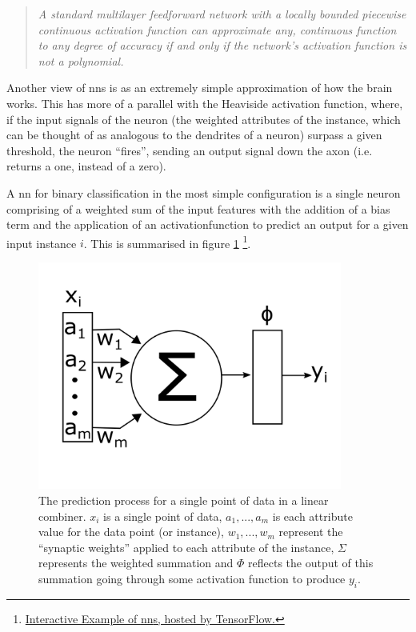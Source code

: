 \begin{quote}
    \textit{A standard multilayer feedforward network with a locally bounded piecewise continuous activation function can approximate any, continuous function to any degree of accuracy if and only if the network's activation function is not a polynomial.\cite{uap_mlp}}
\end{quote}

Another view of \gls{nn}s is as an extremely simple approximation of how the brain works. This has more of a parallel with the Heaviside activation function, where, if the input signals of the neuron (the weighted attributes of the \gls{instance}, which can be thought of as analogous to the dendrites of a neuron) surpass a given threshold, the neuron \enquote{fires}, sending an output signal down the axon (i.e. returns a one, instead of a zero).
\bigskip

A \gls{nn} for binary classification in the most simple configuration is a single \gls{neuron} comprising of a weighted sum of the input features with the addition of a bias term and the application of an \gls{activationfunction} to predict an output for a given input \gls{instance} $i$. This is summarised in figure \ref{fig:nn_simple} \footnote{\href{https://playground.tensorflow.org/}{Interactive Example of \gls{nn}s, hosted by TensorFlow.}}.  
\bigskip

\begin{figure}[H]
    \centering
    \includegraphics[width=100mm]{figs/nn_simple.png}
    \caption[The prediction process for a single point of data in a linear combiner.]{The prediction process for a single point of data in a linear combiner. $x_i$ is a single point of data, $a_1,...,a_m$ is each attribute value for the data point (or instance), $w_1,...,w_m$ represent the \enquote{synaptic weights} applied to each attribute of the instance, $\Sigma$ represents the weighted summation and $\Phi$ reflects the output of this summation going through some activation function to produce $y_i$.}
    \label{fig:nn_simple}
\end{figure}

